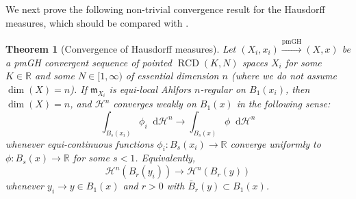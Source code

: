 \documentclass[11pt,reqno]{amsart}
\newtheorem{theorem}{Theorem}[section]
\theoremstyle{definition}
\numberwithin{equation}{section}
\newcommand{\di}{\mathop{}\!\mathrm{d}}
\newcommand{\meas}{\mathfrak{m}}
\DeclareMathOperator{\RCD}{RCD}
\newcommand{\haus}{\mathscr{H}}
\begin{document}
We next prove the following non-trivial convergence result for the Hausdorff measures, which should be compared with \cite{DG}.
\begin{theorem}[Convergence of Hausdorff measures]\label{convhaus}
    Let 
$
(X_i, x_i) \stackrel{\mathrm{pmGH}}{\to} (X, x)
$
be a pmGH convergent sequence of pointed $\RCD(K, N)$ spaces $X_i$ for some $K \in \mathbb{R}$ and some $N \in [1, \infty)$ of essential dimension $n$ (where we do not assume $\dim(X)=n$).
If $\meas_{X_i}$ is equi-local Ahlfors $n$-regular on $B_1(x_i)$, then $\dim(X)=n$, and $\haus^n$ converges   weakly on $B_1(x)$ in the following sense:
\begin{equation}
    \int_{B_s(x_i)}\phi_i\di \haus^n \to \int_{B_s(x)}\phi\di \haus^n
\end{equation}
whenever equi-continuous functions $\phi_i:B_s(x_i) \to \mathbb{R}$  converge uniformly to $\phi:B_s(x) \to \mathbb{R}$ for some $s<1$. Equivalently,
\begin{equation}\label{asbiarkskmcmmsk}
    \haus^n(B_r(y_i)) \to \haus^n(B_r(y))
\end{equation}
whenever $y_i \to y \in B_1(x)$ and $r>0$ with $\bar B_r(y) \subset B_1(x)$.
\end{theorem}
\end{document}
